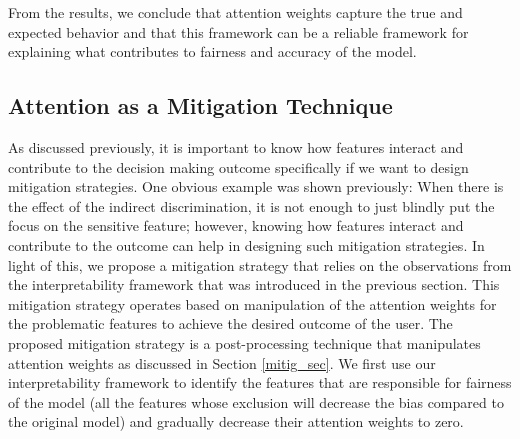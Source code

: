 From the results, we conclude that attention weights capture the true and expected behavior and that this framework can be a reliable framework for explaining what contributes to fairness and accuracy of the model.

\subsection{Attention as a Mitigation Technique}
As discussed previously, it is important to know how features interact and contribute to the decision making outcome specifically if we want to design mitigation strategies. One obvious example was shown previously: When there is the effect of the indirect discrimination, it is not enough to just blindly put the focus on the sensitive feature; however, knowing how features interact and contribute to the outcome can help in designing such mitigation strategies. In light of this, we propose a mitigation strategy that relies on the observations from the interpretability framework that was introduced in the previous section. This mitigation strategy operates based on manipulation of the attention weights for the problematic features to achieve the desired outcome of the user. The proposed mitigation strategy is a post-processing technique that manipulates attention weights as discussed in Section \ref{mitig_sec}. We first use our interpretability framework to identify the features that are responsible for fairness of the model (all the features whose exclusion will decrease the bias compared to the original model) and gradually decrease their attention weights to zero.

